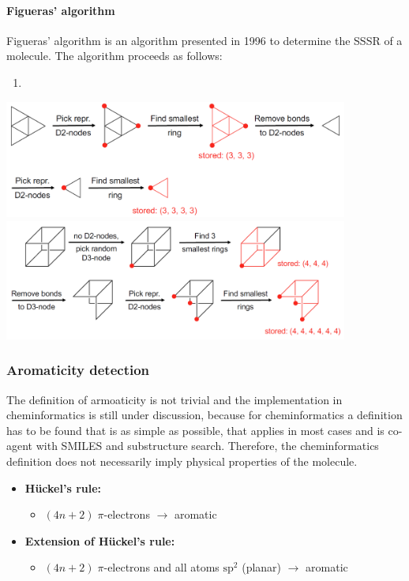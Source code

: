 \paragraph{Figueras' algorithm}
Figueras' algorithm is an algorithm presented in 1996 to determine the SSSR of a molecule. The algorithm proceeds as follows:

\begin{enumerate}
    \item 
\end{enumerate}

\begin{center}\includegraphics[width=0.85\textwidth]{img/cheminformatics/RingPerceptionFigueras1.png}\\\includegraphics[width=0.85\textwidth]{img/cheminformatics/RingPerceptionFigueras2.png}\end{center}

%

\subsubsection{Aromaticity detection}

The definition of armoaticity is not trivial and the implementation in cheminformatics is still under discussion, because for cheminformatics a definition has to be found that is as simple as possible, that applies in most cases and is co-agent with SMILES and substructure search. Therefore, the cheminformatics definition does not necessarily imply physical properties of the molecule.

\begin{itemize}
    \item \textbf{Hückel's rule:}
    \begin{itemize}
        \item $(4n+2)\;\pi$-electrons $\rightarrow$ aromatic
    \end{itemize}
    \item \textbf{Extension of Hückel’s rule:}
    \begin{itemize}
        \item $(4n+2)\;\pi$-electrons and all atoms $\mathrm{sp}^2$ (planar) $\rightarrow$ aromatic
    \end{itemize}
\end{itemize}

